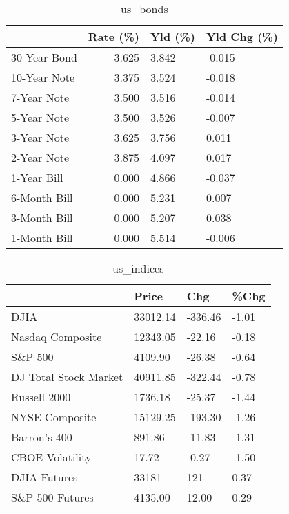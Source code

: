 \documentclass{article}%
\begin{document}
%


\begin{table}[htbp]%
\caption{us\_bonds}%
\centering%
\begin{adjustbox}{width=1\textwidth}%
\begin{tabular}{lrll}
\toprule
             &  Rate (\%) & Yld (\%) & Yld Chg (\%) \\
\midrule
30-Year Bond &     3.625 &   3.842 &      -0.015 \\
10-Year Note &     3.375 &   3.524 &      -0.018 \\
 7-Year Note &     3.500 &   3.516 &      -0.014 \\
 5-Year Note &     3.500 &   3.526 &      -0.007 \\
 3-Year Note &     3.625 &   3.756 &       0.011 \\
 2-Year Note &     3.875 &   4.097 &       0.017 \\
 1-Year Bill &     0.000 &   4.866 &      -0.037 \\
6-Month Bill &     0.000 &   5.231 &       0.007 \\
3-Month Bill &     0.000 &   5.207 &       0.038 \\
1-Month Bill &     0.000 &   5.514 &      -0.006 \\
\bottomrule
\end{tabular}
%
\end{adjustbox}%
\end{table}

%


\begin{table}[htbp]%
\caption{us\_indices}%
\centering%
\begin{adjustbox}{width=1\textwidth}%
\begin{tabular}{llll}
\toprule
                      &    Price &     Chg &  \%Chg \\
\midrule
                 DJIA & 33012.14 & -336.46 & -1.01 \\
     Nasdaq Composite & 12343.05 &  -22.16 & -0.18 \\
              S\&P 500 &  4109.90 &  -26.38 & -0.64 \\
DJ Total Stock Market & 40911.85 & -322.44 & -0.78 \\
         Russell 2000 &  1736.18 &  -25.37 & -1.44 \\
       NYSE Composite & 15129.25 & -193.30 & -1.26 \\
         Barron's 400 &   891.86 &  -11.83 & -1.31 \\
      CBOE Volatility &    17.72 &   -0.27 & -1.50 \\
         DJIA Futures &    33181 &     121 &  0.37 \\
      S\&P 500 Futures &  4135.00 &   12.00 &  0.29 \\
\bottomrule
\end{tabular}
%
\end{adjustbox}%
\end{table}
\end{document}
